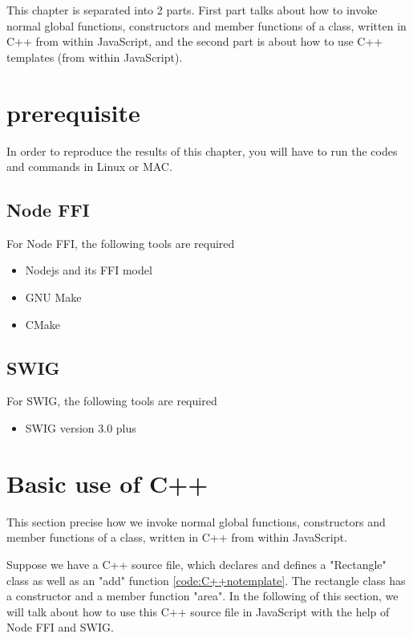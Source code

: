 \label{chap:Experiments}
This chapter is separated into 2 parts. First part talks about how to invoke normal global functions, constructors and member functions of a class, written in C++ from within JavaScript, and the second part is about how to use C++ templates (from within JavaScript).

\section{prerequisite}
In order to reproduce the results of this chapter, you will have to run the codes and commands in Linux or MAC. 

\subsection{Node FFI}
For Node FFI, the following tools are required
    \begin{itemize}
        \item Nodejs and its FFI model
        \item GNU Make 
        \item CMake
    \end{itemize}
       
\subsection{SWIG}
For SWIG, the following tools are required
    \begin{itemize}
        \item SWIG version 3.0 plus
    \end{itemize}

\section{Basic use of C++}
This section precise how we invoke normal global functions, constructors and member functions of a class, written in C++ from within JavaScript.\newline

Suppose we have a C++ source file, which declares and defines a "Rectangle" class as well as an "add" function \ref{code:C++notemplate}. The rectangle class has a constructor and a member function "area". In the following of this section, we will talk about how to use this C++ source file in JavaScript with the help of Node FFI and SWIG. 


